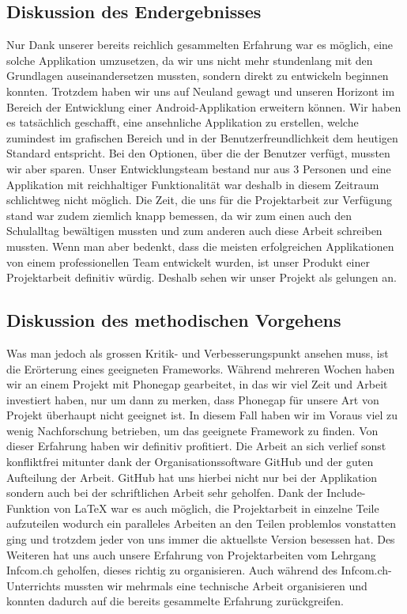 \subsection{Diskussion des Endergebnisses}
Nur Dank unserer bereits reichlich gesammelten Erfahrung war es möglich, eine solche Applikation umzusetzen, da wir uns nicht mehr stundenlang mit den Grundlagen auseinandersetzen mussten, sondern direkt zu entwickeln beginnen konnten. Trotzdem haben wir uns auf Neuland gewagt und unseren Horizont im Bereich der Entwicklung einer Android-Applikation erweitern können. Wir haben es tatsächlich geschafft, eine ansehnliche Applikation zu erstellen, welche zumindest im grafischen Bereich und in der Benutzerfreundlichkeit dem heutigen Standard entspricht. Bei den Optionen, über die der Benutzer verfügt, mussten wir aber sparen. Unser Entwicklungsteam bestand nur aus 3 Personen und eine Applikation mit reichhaltiger Funktionalität war deshalb in diesem Zeitraum schlichtweg nicht möglich. Die Zeit, die uns für die Projektarbeit zur Verfügung stand war zudem ziemlich knapp bemessen, da wir zum einen auch den Schulalltag bewältigen mussten und zum anderen auch diese Arbeit schreiben mussten. Wenn man aber bedenkt, dass die meisten erfolgreichen Applikationen von einem professionellen Team entwickelt wurden, ist unser Produkt einer Projektarbeit definitiv würdig. Deshalb sehen wir unser Projekt als gelungen an.
\subsection{Diskussion des methodischen Vorgehens}
Was man jedoch als grossen Kritik- und Verbesserungspunkt ansehen muss, ist die Erörterung eines geeigneten Frameworks. Während mehreren Wochen haben wir an einem Projekt mit Phonegap gearbeitet, in das wir viel Zeit und Arbeit investiert haben, nur um dann zu merken, dass Phonegap für unsere Art von Projekt überhaupt nicht geeignet ist. In diesem Fall haben wir im Voraus viel zu wenig Nachforschung betrieben, um das geeignete Framework zu finden. Von dieser Erfahrung haben wir definitiv profitiert. Die Arbeit an sich verlief sonst konfliktfrei mitunter dank der Organisationssoftware GitHub und der guten Aufteilung der Arbeit. GitHub hat uns hierbei nicht nur bei der Applikation sondern auch bei der schriftlichen Arbeit sehr geholfen. Dank der Include-Funktion von LaTeX war es auch möglich, die Projektarbeit in einzelne Teile aufzuteilen wodurch ein paralleles Arbeiten an den Teilen problemlos vonstatten ging und trotzdem jeder von uns immer die aktuellste Version besessen hat. Des Weiteren hat uns auch unsere Erfahrung von Projektarbeiten vom Lehrgang Infcom.ch geholfen, dieses richtig zu organisieren. Auch während des Infcom.ch-Unterrichts mussten wir mehrmals eine technische Arbeit organisieren und konnten dadurch auf die bereits gesammelte Erfahrung zurückgreifen.

